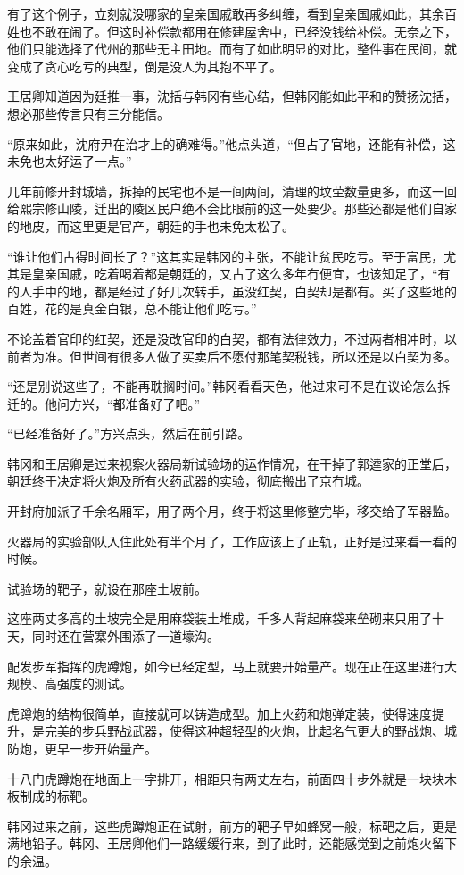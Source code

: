 有了这个例子，立刻就没哪家的皇亲国戚敢再多纠缠，看到皇亲国戚如此，其余百姓也不敢在闹了。但这时补偿款都用在修建屋舍中，已经没钱给补偿。无奈之下，他们只能选择了代州的那些无主田地。而有了如此明显的对比，整件事在民间，就变成了贪心吃亏的典型，倒是没人为其抱不平了。

王居卿知道因为廷推一事，沈括与韩冈有些心结，但韩冈能如此平和的赞扬沈括，想必那些传言只有三分能信。

“原来如此，沈府尹在治才上的确难得。”他点头道，“但占了官地，还能有补偿，这未免也太好运了一点。”

几年前修开封城墙，拆掉的民宅也不是一间两间，清理的坟茔数量更多，而这一回给熙宗修山陵，迁出的陵区民户绝不会比眼前的这一处要少。那些还都是他们自家的地皮，而这里更是官产，朝廷的手也未免太松了。

“谁让他们占得时间长了？”这其实是韩冈的主张，不能让贫民吃亏。至于富民，尤其是皇亲国戚，吃着喝着都是朝廷的，又占了这么多年冇便宜，也该知足了，“有的人手中的地，都是经过了好几次转手，虽没红契，白契却是都有。买了这些地的百姓，花的是真金白银，总不能让他们吃亏。”

不论盖着官印的红契，还是没改官印的白契，都有法律效力，不过两者相冲时，以前者为准。但世间有很多人做了买卖后不愿付那笔契税钱，所以还是以白契为多。

“还是别说这些了，不能再耽搁时间。”韩冈看看天色，他过来可不是在议论怎么拆迁的。他问方兴，“都准备好了吧。”

“已经准备好了。”方兴点头，然后在前引路。

韩冈和王居卿是过来视察火器局新试验场的运作情况，在干掉了郭逵家的正堂后，朝廷终于决定将火炮及所有火药武器的实验，彻底搬出了京冇城。

开封府加派了千余名厢军，用了两个月，终于将这里修整完毕，移交给了军器监。

火器局的实验部队入住此处有半个月了，工作应该上了正轨，正好是过来看一看的时候。

试验场的靶子，就设在那座土坡前。

这座两丈多高的土坡完全是用麻袋装土堆成，千多人背起麻袋来垒砌来只用了十天，同时还在营寨外围添了一道壕沟。

配发步军指挥的虎蹲炮，如今已经定型，马上就要开始量产。现在正在这里进行大规模、高强度的测试。

虎蹲炮的结构很简单，直接就可以铸造成型。加上火药和炮弹定装，使得速度提升，是完美的步兵野战武器，使得这种超轻型的火炮，比起名气更大的野战炮、城防炮，更早一步开始量产。

十八门虎蹲炮在地面上一字排开，相距只有两丈左右，前面四十步外就是一块块木板制成的标靶。

韩冈过来之前，这些虎蹲炮正在试射，前方的靶子早如蜂窝一般，标靶之后，更是满地铅子。韩冈、王居卿他们一路缓缓行来，到了此时，还能感觉到之前炮火留下的余温。
